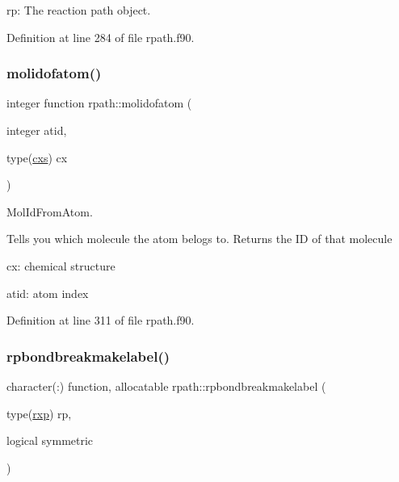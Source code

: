 \begin{DoxyItemize}
\item rp\+: The reaction path object. 
\end{DoxyItemize}

Definition at line 284 of file rpath.\+f90.

\mbox{\label{namespacerpath_a737b05b4102dd39fe9fb25544f8cef5b}} 
\subsubsection{\texorpdfstring{molidofatom()}{molidofatom()}}
{\footnotesize\ttfamily integer function rpath\+::molidofatom (\begin{DoxyParamCaption}\item[{integer}]{atid,  }\item[{type(\mbox{\hyperlink{structchemstr_1_1cxs}{cxs}})}]{cx }\end{DoxyParamCaption})}



Mol\+Id\+From\+Atom. 

Tells you which molecule the atom belogs to. Returns the ID of that molecule


\begin{DoxyItemize}
\item cx\+: chemical structure
\item atid\+: atom index 
\end{DoxyItemize}

Definition at line 311 of file rpath.\+f90.

\mbox{\label{namespacerpath_acfcfa66e72c2f1bd9fd7605b1dbf0c9c}} 
\subsubsection{\texorpdfstring{rpbondbreakmakelabel()}{rpbondbreakmakelabel()}}
{\footnotesize\ttfamily character(\+:) function, allocatable rpath\+::rpbondbreakmakelabel (\begin{DoxyParamCaption}\item[{type(\mbox{\hyperlink{structrpath_1_1rxp}{rxp}})}]{rp,  }\item[{logical}]{symmetric }\end{DoxyParamCaption})}



